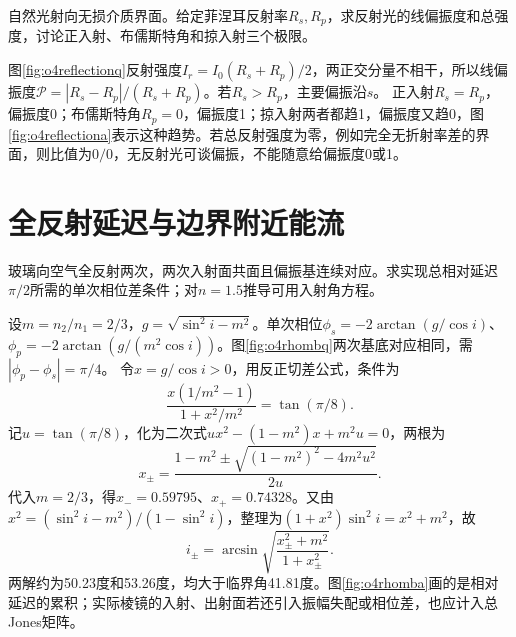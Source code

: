 \begin{example}\label{ex:o4reflectionpolar}
自然光射向无损介质界面。给定菲涅耳反射率$R_s,R_p$，求反射光的线偏振度和总强度，讨论正入射、布儒斯特角和掠入射三个极限。
\end{example}
\begin{solution}
图\ref{fig:o4reflectionq}反射强度$I_r=I_0(R_s+R_p)/2$，两正交分量不相干，所以线偏振度$\mathcal P=|R_s-R_p|/(R_s+R_p)$。若$R_s>R_p$，主要偏振沿$s$。
正入射$R_s=R_p$，偏振度0；布儒斯特角$R_p=0$，偏振度1；掠入射两者都趋1，偏振度又趋0，图\ref{fig:o4reflectiona}表示这种趋势。若总反射强度为零，例如完全无折射率差的界面，则比值为$0/0$，无反射光可谈偏振，不能随意给偏振度0或1。
\end{solution}

\section{全反射延迟与边界附近能流}
\begin{example}\label{ex:o4rhomb}
玻璃向空气全反射两次，两次入射面共面且偏振基连续对应。求实现总相对延迟$\pi/2$所需的单次相位差条件；对$n=1.5$推导可用入射角方程。
\end{example}
\begin{solution}
设$m=n_2/n_1=2/3$，$g=\sqrt{\sin^2i-m^2}$。单次相位$\phi_s=-2\arctan(g/\cos i)$、$\phi_p=-2\arctan(g/(m^2\cos i))$。图\ref{fig:o4rhombq}两次基底对应相同，需$|\phi_p-\phi_s|=\pi/4$。
令$x=g/\cos i>0$，用反正切差公式，条件为
\[
 \frac{x(1/m^2-1)}{1+x^2/m^2}=\tan(\pi/8).
\]
记$u=\tan(\pi/8)$，化为二次式$ux^2-(1-m^2)x+m^2u=0$，两根为
\[
 x_\pm=\frac{1-m^2\pm\sqrt{(1-m^2)^2-4m^2u^2}}{2u}.
\]
代入$m=2/3$，得$x_-=0.59795$、$x_+=0.74328$。又由$x^2=(\sin^2i-m^2)/(1-\sin^2i)$，整理为$(1+x^2)\sin^2i=x^2+m^2$，故
\[
 i_\pm=\arcsin\sqrt{\frac{x_\pm^2+m^2}{1+x_\pm^2}}.
\]
两解约为50.23度和53.26度，均大于临界角41.81度。图\ref{fig:o4rhomba}画的是相对延迟的累积；实际棱镜的入射、出射面若还引入振幅失配或相位差，也应计入总Jones矩阵。
\end{solution}

